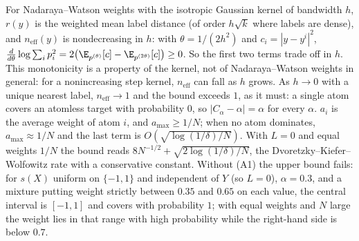 \begin{remark}
For Nadaraya--Watson weights with the isotropic Gaussian kernel of bandwidth $h$, $r(y)$ is the
weighted mean label distance (of order $h\sqrt k$ where labels are dense), and
$n_{\mathrm{eff}}(y)$ is nondecreasing in $h$: with $\theta=1/(2h^2)$ and $c_i=|y-y^i|^2$,
$\frac{d}{d\theta}\log\sum_ip_i^2=2\big(\E_{p^{(\theta)}}[c]-\E_{p^{(2\theta)}}[c]\big)\ge0$. So the
first two terms trade off in $h$. This monotonicity is a property of the kernel, not of
Nadaraya--Watson weights in general: for a nonincreasing step kernel, $n_{\mathrm{eff}}$ can fall
as $h$ grows. As $h\to0$ with a unique nearest label, $n_{\mathrm{eff}}\to1$ and the bound
exceeds $1$, as it must: a single atom covers an atomless target with probability $0$, so
$|C_\alpha-\alpha|=\alpha$ for every $\alpha$. $a_i$ is the average weight of atom $i$, and
$a_{\max}\ge1/N$; when no atom dominates, $a_{\max}\approx1/N$ and the last term is
$O(\sqrt{\log(1/\delta)/N})$. With $L=0$ and equal weights $1/N$ the bound reads
$8N^{-1/2}+\sqrt{2\log(1/\delta)/N}$, the Dvoretzky--Kiefer--Wolfowitz rate with a
conservative constant. Without (A1) the upper bound fails: for $s(X)$ uniform on $\{-1,1\}$
and independent of $Y$ (so $L=0$), $\alpha=0.3$, and a mixture putting weight strictly between
$0.35$ and $0.65$ on each value, the central interval is $[-1,1]$ and covers with probability
$1$; with equal weights and $N$ large the weight lies in that range with high probability while
the right-hand side is below $0.7$.
\end{remark}
